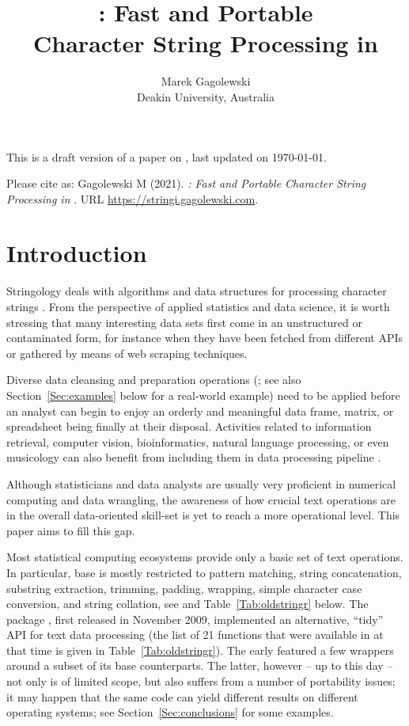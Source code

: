 \documentclass[nojss]{jss}\usepackage[]{graphicx}\usepackage[]{color}
\author{Marek Gagolewski\\
Deakin University, Australia} %
\title{\pkg{stringi}: Fast and Portable\\Character String
Processing in \proglang{R}}
\begin{document}
{\color{blue}
This is a draft version of a paper on ,
last updated on \today.

Please cite as:
Gagolewski M (2021).
\textit{: Fast and Portable Character String Processing in }.
URL \url{https://stringi.gagolewski.com}.
}



\section{Introduction}\label{Sec:intro}

Stringology \citep{stringology}
deals with algorithms and data structures for processing
character strings \citep{speechlangproc,szpankowski}.
From the perspective of applied statistics and data science,
it is worth stressing that many interesting data sets
first come in an unstructured or contaminated form,
for instance when they have been fetched from different APIs or gathered
by means of web scraping techniques.

Diverse data cleansing and preparation operations
(\citealp{datacleaning,cleanr}; see also
Section~\ref{Sec:examples} below for a real-world example)
need to be applied before an analyst can begin to enjoy
an orderly and meaningful data frame, matrix, or spreadsheet  being finally
at their disposal.
Activities related to information retrieval, computer vision,
bioinformatics, natural language processing, or even musicology
can also benefit from including them
in data processing pipeline \citep{speechlangproc,genome}.


Although statisticians and data analysts are usually
very proficient in numerical computing and data wrangling,
the awareness of how crucial text operations are in the overall
data-oriented skill-set is yet to reach a more operational
level. This paper aims to fill this gap.

\bigskip
Most statistical computing ecosystems provide only a basic set
of text operations.
In particular, base  \citep{Rproject:home}
is mostly restricted to pattern matching, string concatenation,
substring extraction, trimming, padding, wrapping,
simple character case conversion, and string collation,
see \citep[Chapter~8]{Chambers2008:SoftDA} and Table~\ref{Tab:oldstringr} below.
The   package \citep{Wickham2010:stringr},
first released in November 2009, implemented an alternative, ``tidy''
API for text data processing (the list of 21 functions that were
available in  at that time is given in Table~\ref{Tab:oldstringr}).
The early  featured a few wrappers around
a subset of its base  counterparts. The latter,
however -- up to this day -- not only is of limited scope,
but also suffers from a number of portability
issues; it may happen that the same code can yield different results
on different operating systems; see Section~\ref{Sec:conclusions} for some examples.
\end{document}
